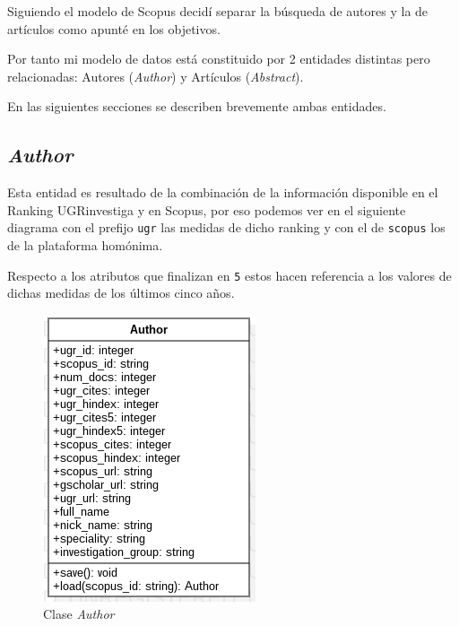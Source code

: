 Siguiendo el modelo de Scopus decidí separar la búsqueda de autores y la de artículos como apunté en los objetivos.

Por tanto mi modelo de datos está constituido por 2 entidades distintas pero relacionadas: Autores (\textit{Author}) y Artículos (\textit{Abstract}). 

En las siguientes secciones se describen brevemente ambas entidades.


\subsection{\textit{Author}}
\label{subsc:author}
Esta entidad es resultado de la combinación de la información disponible en el Ranking UGRinvestiga \cite{Ranking_UGRInvestiga} y en Scopus, por eso podemos ver en el siguiente diagrama con el prefijo \texttt{ugr} las medidas de dicho ranking y con el de \texttt{scopus} los de la plataforma homónima. 

Respecto a los atributos que finalizan en \texttt{5} estos hacen referencia a los valores de dichas medidas de los últimos cinco años.

\begin{figure}[ht]
	
	\centering
	\includegraphics[width=0.5\linewidth]{imagenes/Author}
	\caption{Clase \textit{Author}}
\end{figure}

\newpage

